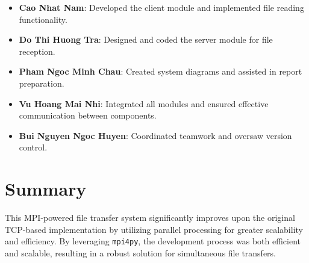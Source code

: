 \documentclass{article}
\begin{document}
\begin{itemize}
    \item \textbf{Cao Nhat Nam}: Developed the client module and implemented file reading functionality.
    \item \textbf{Do Thi Huong Tra}: Designed and coded the server module for file reception.
    \item \textbf{Pham Ngoc Minh Chau}: Created system diagrams and assisted in report preparation.
    \item \textbf{Vu Hoang Mai Nhi}: Integrated all modules and ensured effective communication between components.
    \item \textbf{Bui Nguyen Ngoc Huyen}: Coordinated teamwork and oversaw version control.
\end{itemize}

\section{Summary}

This MPI-powered file transfer system significantly improves upon the original TCP-based implementation by utilizing parallel processing for greater scalability and efficiency. By leveraging \texttt{mpi4py}, the development process was both efficient and scalable, resulting in a robust solution for simultaneous file transfers.
\end{document}
